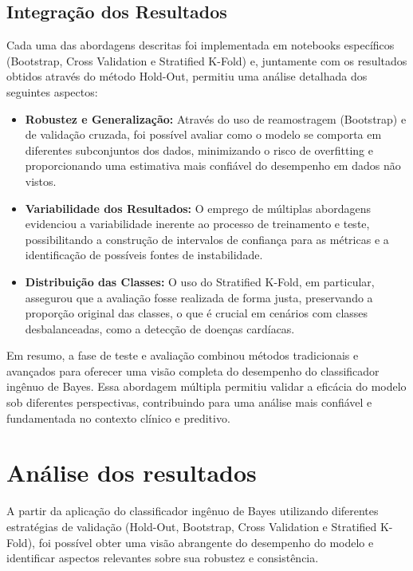\documentclass[conference]{IEEEtran}
\begin{document}
\subsection{Integração dos Resultados}
Cada uma das abordagens descritas foi implementada em notebooks específicos (Bootstrap, Cross Validation e Stratified K-Fold) e, juntamente com os resultados obtidos através do método Hold-Out, permitiu uma análise detalhada dos seguintes aspectos:
\begin{itemize}
    \item \textbf{Robustez e Generalização:} Através do uso de reamostragem (Bootstrap) e de validação cruzada, foi possível avaliar como o modelo se comporta em diferentes subconjuntos dos dados, minimizando o risco de overfitting e proporcionando uma estimativa mais confiável do desempenho em dados não vistos.
    \item \textbf{Variabilidade dos Resultados:} O emprego de múltiplas abordagens evidenciou a variabilidade inerente ao processo de treinamento e teste, possibilitando a construção de intervalos de confiança para as métricas e a identificação de possíveis fontes de instabilidade.
    \item \textbf{Distribuição das Classes:} O uso do Stratified K-Fold, em particular, assegurou que a avaliação fosse realizada de forma justa, preservando a proporção original das classes, o que é crucial em cenários com classes desbalanceadas, como a detecção de doenças cardíacas.
\end{itemize}

Em resumo, a fase de teste e avaliação combinou métodos tradicionais e avançados para oferecer uma visão completa do desempenho do classificador ingênuo de Bayes. Essa abordagem múltipla permitiu validar a eficácia do modelo sob diferentes perspectivas, contribuindo para uma análise mais confiável e fundamentada no contexto clínico e preditivo.

\section{Análise dos resultados}
A partir da aplicação do classificador ingênuo de Bayes utilizando diferentes estratégias de validação (Hold-Out, Bootstrap, Cross Validation e Stratified K-Fold), foi possível obter uma visão abrangente do desempenho do modelo e identificar aspectos relevantes sobre sua robustez e consistência.
\end{document}

